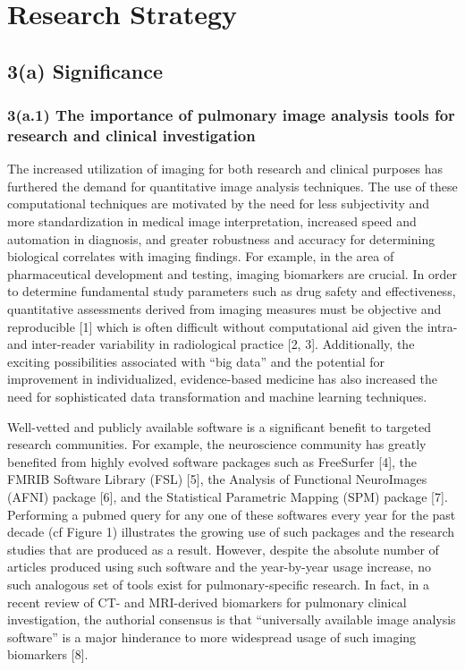 \documentclass[11pt,]{article}
\begin{document}
\newpage

\section{Research Strategy}\label{research-strategy}

\subsection{\textbf{3(a) Significance}}\label{a-significance}

\subsubsection{3(a.1) The importance of pulmonary image analysis tools
for research and clinical
investigation}\label{a.1-the-importance-of-pulmonary-image-analysis-tools-for-research-and-clinical-investigation}

The increased utilization of imaging for both research and clinical
purposes has furthered the demand for quantitative image analysis
techniques. The use of these computational techniques are motivated by
the need for less subjectivity and more standardization in medical image
interpretation, increased speed and automation in diagnosis, and greater
robustness and accuracy for determining biological correlates with
imaging findings. For example, in the area of pharmaceutical development
and testing, imaging biomarkers are crucial. In order to determine
fundamental study parameters such as drug safety and effectiveness,
quantitative assessments derived from imaging measures must be objective
and reproducible {[}1{]} which is often difficult without computational
aid given the intra- and inter-reader variability in radiological
practice {[}2, 3{]}. Additionally, the exciting possibilities associated
with ``big data'' and the potential for improvement in individualized,
evidence-based medicine has also increased the need for sophisticated
data transformation and machine learning techniques.

Well-vetted and publicly available software is a significant benefit to
targeted research communities. For example, the neuroscience community
has greatly benefited from highly evolved software packages such as
FreeSurfer {[}4{]}, the FMRIB Software Library (FSL) {[}5{]}, the
Analysis of Functional NeuroImages (AFNI) package {[}6{]}, and the
Statistical Parametric Mapping (SPM) package {[}7{]}. Performing a
pubmed query for any one of these softwares every year for the past
decade (cf Figure 1) illustrates the growing use of such packages and
the research studies that are produced as a result. However, despite the
absolute number of articles produced using such software and the
year-by-year usage increase, no such analogous set of tools exist for
pulmonary-specific research. In fact, in a recent review of CT- and
MRI-derived biomarkers for pulmonary clinical investigation, the
authorial consensus is that ``universally available image analysis
software'' is a major hinderance to more widespread usage of such
imaging biomarkers {[}8{]}.
\end{document}
